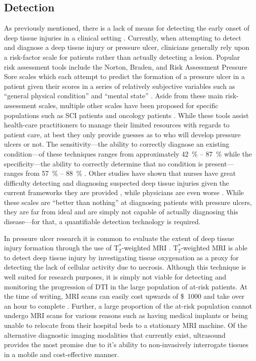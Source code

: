 		\subsection{Detection}
			As previously mentioned, there is a lack of means for detecting the early onset of deep tissue injuries in a clinical setting \cite{gunningberg08,milne09}. Currently, when attempting to detect and diagnose a deep tissue injury or pressure ulcer, clinicians generally rely upon a risk-factor scale for patients rather than actually detecting a lesion. Popular risk assessment tools include the Norton, Braden, and Risk Assessment Pressure Sore scales which each attempt to predict the formation of a pressure ulcer in a patient given their scores in a series of relatively subjective variables such as ``general physical condition'' and ``mental state'' \cite{norton63,braden94,lindgren02}. Aside from these main risk-assessment scales, multiple other scales have been proposed for specific populations such as SCI patients \cite{salzberg96} and oncology patients \cite{fromantin11}. While these tools assist health-care practitioners to manage their limited resources with regards to patient care, at best they only provide guesses as to who will develop pressure ulcers or not. The sensitivity---the ability to correctly diagnose an existing condition---of these techniques ranges from approximately \SI{42}{\percent} -- \SI{87}{\percent} while the specificity---the ability to correctly determine that no condition is present---ranges from \SI{57}{\percent} -- \SI{88}{\percent} \cite{kallman14}. Other studies have shown that nurses have great difficulty detecting and diagnosing suspected deep tissue injuries given the current frameworks they are provided \cite{lee13}, while physicians are even worse \cite{levine12}. While these scales are ``better than nothing'' at diagnosing patients with pressure ulcers, they are far from ideal and are simply not capable of actually diagnosing this disease---for that, a quantifiable detection technology is required.

			In pressure ulcer research it is common to evaluate the extent of deep tissue injury formation through the use of $\mathrm{T}_2^*$-weighted MRI \cite{loerakker11,stekelenburg06,solis12-03}. $\mathrm{T}_2^*$-weighted MRI is able to detect deep tissue injury by investigating tissue oxygenation as a proxy for detecting the lack of cellular activity due to necrosis. Although this technique is well suited for research purposes, it is simply not viable for detecting and monitoring the progression of DTI in the large population of at-risk patients. At the time of writing, MRI scans can easily cost upwards of \SI{1000}[\$]{} and take over an hour to complete . Further, a large proportion of the at-risk population cannot undergo MRI scans for various reasons such as having medical implants or being unable to relocate from their hospital beds to a stationary MRI machine. Of the alternative diagnostic imaging modalities that currently exist, ultrasound provides the most promise due to it's ability to non-invasively interrogate tissues in a mobile and cost-effective manner.

